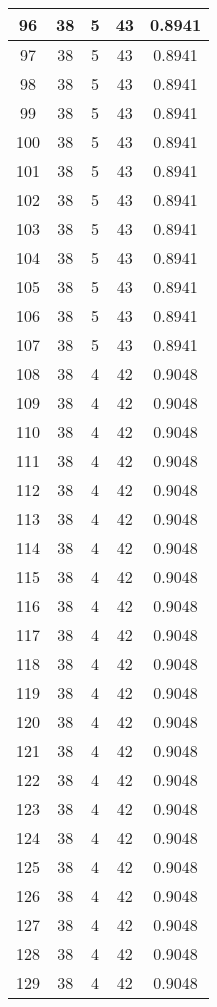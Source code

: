 \documentclass[letterpaper, 12pt]{article}
\begin{document}
\begin{longtable}{|c|c|c|c|c|}
\hline
96 & 38 & 5 & 43 & 0.8941 \\
\hline
97 & 38 & 5 & 43 & 0.8941 \\
\hline
98 & 38 & 5 & 43 & 0.8941 \\
\hline
99 & 38 & 5 & 43 & 0.8941 \\
\hline
100 & 38 & 5 & 43 & 0.8941 \\
\hline
101 & 38 & 5 & 43 & 0.8941 \\
\hline
102 & 38 & 5 & 43 & 0.8941 \\
\hline
103 & 38 & 5 & 43 & 0.8941 \\
\hline
104 & 38 & 5 & 43 & 0.8941 \\
\hline
105 & 38 & 5 & 43 & 0.8941 \\
\hline
106 & 38 & 5 & 43 & 0.8941 \\
\hline
107 & 38 & 5 & 43 & 0.8941 \\
\hline
108 & 38 & 4 & 42 & 0.9048 \\
\hline
109 & 38 & 4 & 42 & 0.9048 \\
\hline
110 & 38 & 4 & 42 & 0.9048 \\
\hline
111 & 38 & 4 & 42 & 0.9048 \\
\hline
112 & 38 & 4 & 42 & 0.9048 \\
\hline
113 & 38 & 4 & 42 & 0.9048 \\
\hline
114 & 38 & 4 & 42 & 0.9048 \\
\hline
115 & 38 & 4 & 42 & 0.9048 \\
\hline
116 & 38 & 4 & 42 & 0.9048 \\
\hline
117 & 38 & 4 & 42 & 0.9048 \\
\hline
118 & 38 & 4 & 42 & 0.9048 \\
\hline
119 & 38 & 4 & 42 & 0.9048 \\
\hline
120 & 38 & 4 & 42 & 0.9048 \\
\hline
121 & 38 & 4 & 42 & 0.9048 \\
\hline
122 & 38 & 4 & 42 & 0.9048 \\
\hline
123 & 38 & 4 & 42 & 0.9048 \\
\hline
124 & 38 & 4 & 42 & 0.9048 \\
\hline
125 & 38 & 4 & 42 & 0.9048 \\
\hline
126 & 38 & 4 & 42 & 0.9048 \\
\hline
127 & 38 & 4 & 42 & 0.9048 \\
\hline
128 & 38 & 4 & 42 & 0.9048 \\
\hline
129 & 38 & 4 & 42 & 0.9048 \\

\end{longtable}
\end{document}
